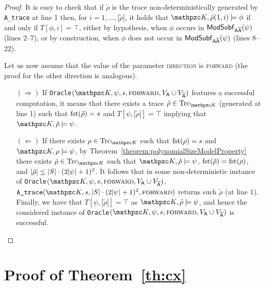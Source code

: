 \begin{proof}
 It is easy to check that if $\tilde{\rho}$ is the trace non-deterministically generated by \texttt{A\_trace} at line 1  then, for $i=1,\ldots, |\tilde{\rho}|$, it holds that $\Ku,\tilde{\rho}(1,i)\models\phi$ if and only if $T[\phi,i]=\top$, either by hypothesis, when  $\phi$ occurs in  $\mathsf{ModSubf}_{\mathsf{A\overline{A}}}(\psi)$ (lines 2--7), or by construction, when $\phi$ does not occur in $\mathsf{ModSubf}_{\mathsf{A\overline{A}}}(\psi)$ (lines 8--22).

Let us now assume that the value of the parameter \textsc{direction} is \textsc{forward} (the proof for the other direction is analogous).

\begin{itemize}
	\item[$(\Rightarrow)$] If \texttt{Oracle}$(\Ku,\psi,s,\textsc{forward},V_{\A}\cup V_{\Abar})$ features a successful computation, it means that there exists a trace $\tilde{\rho} \in\Trk_{\Ku}$ (generated at line 1) such that $\operatorname{fst}(\tilde{\rho})=s$ and $T[\psi,|\tilde{\rho}|]=\top$ implying that $\Ku,\tilde{\rho}\models\psi$.

	\item[$(\Leftarrow)$] If there exists $\rho\in\Trk_{\Ku}$ such that $\operatorname{fst}(\rho)=s$ and $\Ku,\rho\models \psi$, by Theorem~\ref{theorem:polynomialSizeModelProperty} there exists $\tilde{\rho}\in\Trk_{\Ku}$ such that $\Ku,\tilde{\rho}\models \psi$, $\operatorname{fst}(\tilde{\rho})=\operatorname{fst}(\rho)$, and $|\tilde{\rho}|\leq
	|S|\cdot (2|\psi|+1)^2$.
	It follows that in some non-deterministic instance of \texttt{Oracle}$(\Ku,\psi,s,\textsc{forward},V_{\A}\cup V_{\Abar})$, $\texttt{A\_trace}(\Ku,s,|\States|\cdot(2|\psi|+1)^2,\textsc{forward})$ returns such $\tilde{\rho}$ (at line 1). Finally, we have that $T[\psi,|\tilde{\rho}|]=\top$ as $\Ku,\tilde{\rho}\models \psi$, and hence the considered instance of \texttt{Oracle}$(\Ku,\psi,s,\allowbreak \textsc{forward},V_{\A}\cup V_{\Abar})$ is successful.\qedhere
\end{itemize}
\end{proof}


\section{Proof of Theorem~\ref{th:cx}}\label{proof:th:cx}

